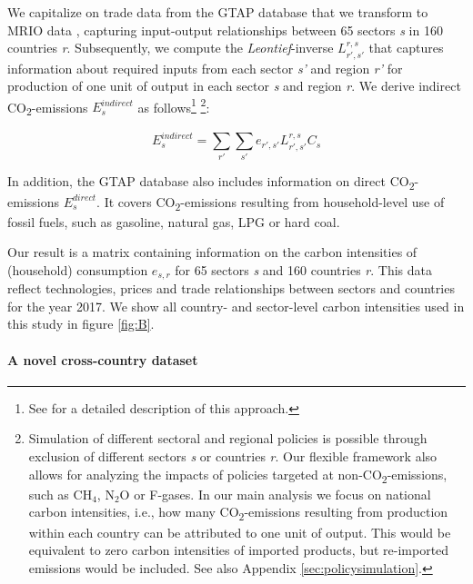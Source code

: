 \documentclass[12pt, a4paper]{article}
\begin{document}
We capitalize on trade data from the GTAP database \autocite[Version 11, ][]{Aguiar.2022} that we transform to MRIO data \autocite{Peters.2011}, capturing input-output relationships between 65 sectors \textit{s} in 160 countries \textit{r}. Subsequently, we compute the \textit{Leontief}-inverse $L_{r',s'}^{r,s}$ that captures information about required inputs from each sector \textit{s'} and region \textit{r'} for production of one unit of output in each sector \textit{s} and region \textit{r}. We derive indirect CO\textsubscript{2}-emissions $E_{s}^{indirect}$ as follows\footnote{See \textcite{Missbach.2024, Steckel.2021b,Feindt.2021,VogtSchilb.2019} for a detailed description of this approach.} \footnote{Simulation of different sectoral and regional policies is possible through exclusion of different sectors \textit{s} or countries \textit{r}. Our flexible framework also allows for analyzing the impacts of policies targeted at non-CO\textsubscript{2}-emissions, such as CH$_{4}$, N$_{2}$O or F-gases. In our main analysis we focus on national carbon intensities, i.e., how many CO\textsubscript{2}-emissions resulting from production within each country can be attributed to one unit of output. This would be equivalent to zero carbon intensities of imported products, but re-imported emissions would be included. See also Appendix \ref{sec:policysimulation}.}:

\begin{equation}
    E_{s}^{indirect} = \sum_{r'} \sum_{s'} e_{r',s'} L_{r',s'}^{r,s} C_{s}
\end{equation}

In addition, the GTAP database also includes information on direct CO\textsubscript{2}-emissions $E_{s}^{direct}$. It covers CO\textsubscript{2}-emissions resulting from household-level use of fossil fuels, such as gasoline, natural gas, LPG or hard coal.

Our result is a matrix containing information on the carbon intensities of (household) consumption $e_{s,r}$ for 65 sectors \textit{s} and 160 countries \textit{r}. This data reflect technologies, prices and trade relationships between sectors and countries for the year 2017. We show all country- and sector-level carbon intensities used in this study in figure \ref{fig:B}.

\paragraph{A novel cross-country dataset} 
\end{document}
